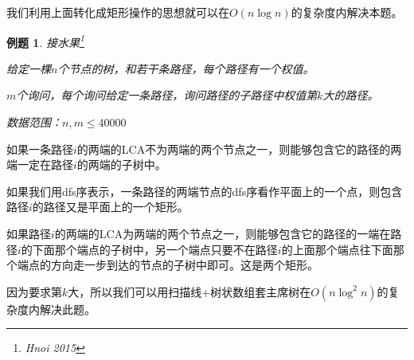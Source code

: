 \documentclass[a4paper]{article}
\newtheorem{problem}{例题}
\begin{document}
我们利用上面转化成矩形操作的思想就可以在$O(n\log n)$的复杂度内解决本题。

\begin{problem}
  接水果\footnote{Hnoi 2015}

  给定一棵$n$个节点的树，和若干条路径，每个路径有一个权值。

  $m$个询问，每个询问给定一条路径，询问路径的子路径中权值第$k$大的路径。

  数据范围：$n,m\leq 40000$
\end{problem}

如果一条路径$i$的两端的LCA不为两端的两个节点之一，则能够包含它的路径的两端一定在路径$i$的两端的子树中。

如果我们用dfs序表示，一条路径的两端节点的dfs序看作平面上的一个点，则包含路径$i$的路径又是平面上的一个矩形。

如果路径$i$的两端的LCA为两端的两个节点之一，则能够包含它的路径的一端在路径$i$的下面那个端点的子树中，另一个端点只要不在路径$i$的上面那个端点往下面那个端点的方向走一步到达的节点的子树中即可。这是两个矩形。

因为要求第$k$大，所以我们可以用扫描线+树状数组套主席树在$O(n\log^2 n)$的复杂度内解决此题。
\end{document}
